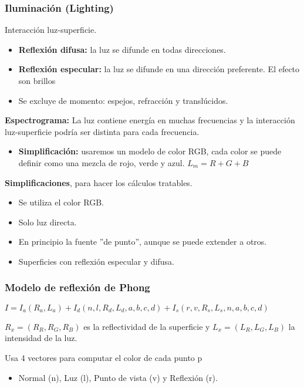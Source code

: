\subsubsection{Iluminación (Lighting)} 
Interacción luz-superficie.
\begin{itemize}
    \item \textbf{Reflexión difusa:} la luz se difunde en todas direcciones.
    \item \textbf{Reflexión especular:} la luz se difunde en una dirección preferente. El efecto son brillos
    \item Se excluye de momento: espejos, refracción y translúcidos.
\end{itemize}

\textbf{Espectrograma:} La luz contiene energía en muchas frecuencias y la interacción luz-superficie podría ser distinta para cada frecuencia. 
\begin{itemize}
    \item \textbf{Simplificación:} usaremos un modelo de color RGB, cada color se puede definir como una mezcla de rojo, verde y azul. $L_m=R+G+B$
\end{itemize} 

\textbf{Simplificaciones}, para hacer los cálculos tratables.
\begin{itemize}
    \item Se utiliza el color RGB.
    \item Solo luz directa.
    \item En principio la fuente ''de punto'', aunque se puede extender a otros.
    \item Superficies con reflexión especular y difusa.
\end{itemize}

\subsubsection{Modelo de reflexión de Phong} 
$I=I_a(R_a,L_a)+I_d(n, l, R_d, L_d, a, b, c, d)+I_s(r,v, R_s, L_s, n, a, b, c, d)$

$R_x=(R_R, R_G, R_B)$ es la reflectividad de la superficie y $L_x=(L_R, L_G, L_B)$ la intensidad de la luz.

Usa 4 vectores para computar el color de cada punto p
    \begin{itemize}
        \item Normal (n), Luz (l), Punto de vista (v) y Reflexión (r).
    \end{itemize}

